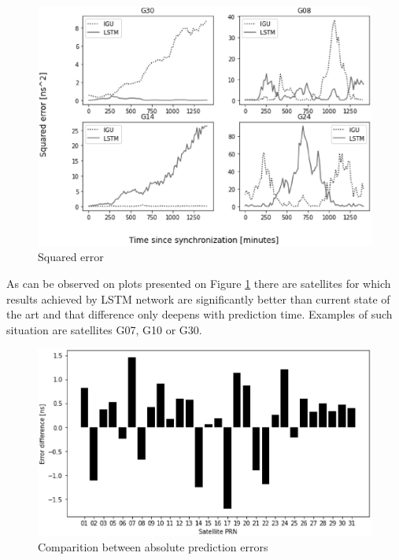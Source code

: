 \documentclass{article}
\begin{document}
\begin{figure}[htb] 
\centering
	\includegraphics[width=\textwidth]{figures/error_overwiev}
\caption{Squared error}
\label{fig:error_overview}
\end{figure}
As can be observed on plots presented on Figure \ref{fig:error_overview} there are satellites
for which results achieved by LSTM network are significantly better than current state of the
art and that difference only deepens with prediction time. Examples of such situation are
satellites G07, G10 or G30.
\begin{figure}[ht] 
\centering
	\includegraphics[width=\textwidth]{figures/error_diff}
\caption{Comparition between absolute prediction errors}
\label{fig:error_comparition}
\end{figure}
\end{document}

